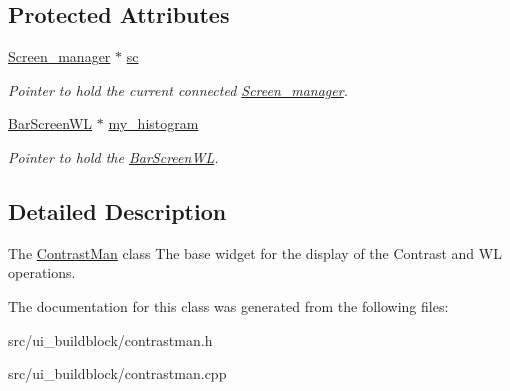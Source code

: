 \subsection*{Protected Attributes}
\begin{DoxyCompactItemize}
\item 
\mbox{\label{classContrastMan_ae9cdb0488404448a230e444c204ca79b}} 
\mbox{\hyperlink{classScreen__manager}{Screen\+\_\+manager}} $\ast$ \mbox{\hyperlink{classContrastMan_ae9cdb0488404448a230e444c204ca79b}{sc}}
\begin{DoxyCompactList}\small\item\em Pointer to hold the current connected \mbox{\hyperlink{classScreen__manager}{Screen\+\_\+manager}}. \end{DoxyCompactList}\item 
\mbox{\label{classContrastMan_a2d36ff4044963f35a1f9a1dc190b7b85}} 
\mbox{\hyperlink{classBarScreenWL}{Bar\+Screen\+WL}} $\ast$ \mbox{\hyperlink{classContrastMan_a2d36ff4044963f35a1f9a1dc190b7b85}{my\+\_\+histogram}}
\begin{DoxyCompactList}\small\item\em Pointer to hold the \mbox{\hyperlink{classBarScreenWL}{Bar\+Screen\+WL}}. \end{DoxyCompactList}\end{DoxyCompactItemize}


\subsection{Detailed Description}
The \mbox{\hyperlink{classContrastMan}{Contrast\+Man}} class The base widget for the display of the Contrast and WL operations. 

The documentation for this class was generated from the following files\+:\begin{DoxyCompactItemize}
\item 
src/ui\+\_\+buildblock/contrastman.\+h\item 
src/ui\+\_\+buildblock/contrastman.\+cpp\end{DoxyCompactItemize}
